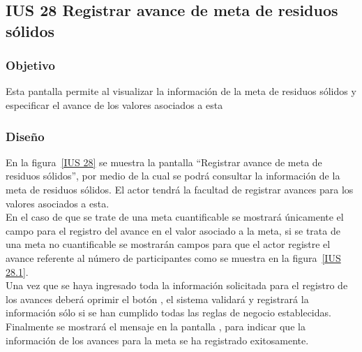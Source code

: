 \subsection{IUS 28 Registrar avance de meta de residuos sólidos}

\subsubsection{Objetivo}

    Esta pantalla permite al  visualizar la información de la meta de residuos sólidos y especificar el avance de los valores asociados a esta
    
\subsubsection{Diseño}

        En la figura~\ref{IUS 28} se muestra la pantalla ``Registrar avance de meta de residuos sólidos'', por medio de la cual se podrá consultar la información de la meta de residuos sólidos. El actor tendrá la facultad de registrar avances para los valores asociados a esta.\\
        
        En el caso de que se trate de una meta cuantificable se mostrará únicamente el campo para el registro del avance en el valor asociado a la meta, si se trata de una meta no cuantificable se mostrarán campos para que el actor registre el avance referente al número de participantes como se muestra en la figura~\ref{IUS 28.1}.\\
        
        Una vez que se haya ingresado toda la información solicitada para el registro de los avances deberá oprimir el botón , el sistema validará y registrará la información sólo si se han cumplido todas las reglas de negocio establecidas.\\
    
      Finalmente se mostrará el mensaje  en la pantalla , para indicar que la información de los avances para la meta se ha registrado exitosamente.
        

